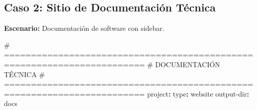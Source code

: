 \documentclass[
  doc,
  floatsintext,
  longtable,
  a4paper,
  nolmodern,
  notxfonts,
  notimes,
  12pt,
  colorlinks=true,linkcolor=blue,citecolor=blue,urlcolor=blue]{apa7}
\newenvironment{Shaded}{\begin{snugshade}}{\end{snugshade}}
\newcommand{\AttributeTok}[1]{\textcolor[rgb]{0.40,0.45,0.13}{#1}}
\newcommand{\CommentTok}[1]{\textcolor[rgb]{0.37,0.37,0.37}{#1}}
\newcommand{\FunctionTok}[1]{\textcolor[rgb]{0.28,0.35,0.67}{#1}}
\newcommand{\KeywordTok}[1]{\textcolor[rgb]{0.00,0.23,0.31}{\textbf{#1}}}
\begin{document}
\subsection{Caso 2: Sitio de Documentación
Técnica}\label{caso-2-sitio-de-documentaciuxf3n-tuxe9cnica}

\textbf{Escenario:} Documentación de software con sidebar.

\begin{Shaded}
\begin{Highlighting}[]
\CommentTok{\# ========================================================================}
\CommentTok{\# DOCUMENTACIÓN TÉCNICA}
\CommentTok{\# ========================================================================}
\FunctionTok{project}\KeywordTok{:}
\AttributeTok{  }\FunctionTok{type}\KeywordTok{:}\AttributeTok{ website}
\AttributeTok{  }\FunctionTok{output{-}dir}\KeywordTok{:}\AttributeTok{ docs}


\end{Highlighting}
\end{Shaded}
\end{document}
